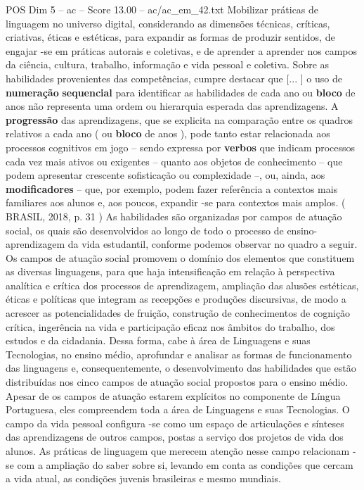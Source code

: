 \begin{textsample}{POS Dim 5 – ac – Score 13.00 – ac/ac\_em\_42.txt}
Mobilizar práticas de linguagem no universo digital, considerando as dimensões técnicas, críticas, criativas, éticas e estéticas, para expandir as formas de produzir sentidos, de engajar -se em práticas autorais e coletivas, e de aprender a aprender nos campos da ciência, cultura, trabalho, informação e vida pessoal e coletiva.
Sobre as habilidades provenientes das competências, cumpre destacar que [... ] o uso de \textbf{numeração} \textbf{sequencial} para identificar as habilidades de cada ano ou \textbf{bloco} de anos não representa uma ordem ou hierarquia esperada das aprendizagens.
A \textbf{progressão} das aprendizagens, que se explicita na comparação entre os quadros relativos a cada ano ( ou \textbf{bloco} de anos ), pode tanto estar relacionada aos processos cognitivos em jogo – sendo expressa por \textbf{verbos} que indicam processos cada vez mais ativos ou exigentes – quanto aos objetos de conhecimento – que podem apresentar crescente sofisticação ou complexidade –, ou, ainda, aos \textbf{modificadores} – que, por exemplo, podem fazer referência a contextos mais familiares aos alunos e, aos poucos, expandir -se para contextos mais amplos. ( BRASIL, 2018, p. 31 ) As habilidades são organizadas por campos de atuação social, os quais são desenvolvidos ao longo de todo o processo de ensino-aprendizagem da vida estudantil, conforme podemos observar no quadro a seguir.
Os campos de atuação social promovem o domínio dos elementos que constituem as diversas linguagens, para que haja intensificação em relação à perspectiva analítica e crítica dos processos de aprendizagem, ampliação das alusões estéticas, éticas e políticas que integram as recepções e produções discursivas, de modo a acrescer as potencialidades de fruição, construção de conhecimentos de cognição crítica, ingerência na vida e participação eficaz nos âmbitos do trabalho, dos estudos e da cidadania.
Dessa forma, cabe à área de Linguagens e suas Tecnologias, no ensino médio, aprofundar e analisar as formas de funcionamento das linguagens e, consequentemente, o desenvolvimento das habilidades que estão distribuídas nos cinco campos de atuação social propostos para o ensino médio.
Apesar de os campos de atuação estarem explícitos no componente de Língua Portuguesa, eles compreendem toda a área de Linguagens e suas Tecnologias.
O campo da vida pessoal configura -se como um espaço de articulações e sínteses das aprendizagens de outros campos, postas a serviço dos projetos de vida dos alunos.
As práticas de linguagem que merecem atenção nesse campo relacionam -se com a ampliação do saber sobre si, levando em conta as condições que cercam a vida atual, as condições juvenis brasileiras e mesmo mundiais.

\end{textsample}
